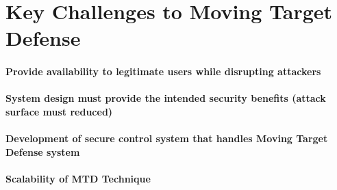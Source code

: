 \section{Key Challenges to Moving Target Defense}
\paragraph{Provide availability to legitimate users while disrupting attackers}
\paragraph{System design must provide the intended security benefits (attack surface must reduced)}
\paragraph{Development of secure control system that handles Moving Target Defense system}
\paragraph{Scalability of MTD Technique}
	